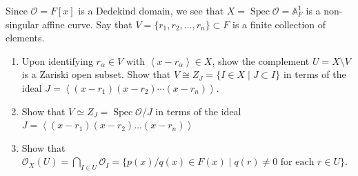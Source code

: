 \documentclass[12 pt, letterpaper]{hmcpset}
\begin{document}
\begin{problem}[Problem 5.]
	Since $\mathcal{O} = F[x]$ is a Dedekind domain, we see that $X = \operatorname{Spec} \mathcal{O} = \mathbb{A}^{1}_{F}$ is a non-singular affine curve. Say that $V = \{ r_{1}, r_{2}, \dots, r_{n} \} \subset F$ is a finite collection of elements.
	\begin{enumerate}
		\item Upon identifying $r_{\alpha} \in V$ with $\left < x - r_{\alpha} \right > \in X$, show the complement $U = X \setminus V$ is a Zariski open subset. Show that $V \cong Z_{J} = \{ I \in X \mid J \subset I \}$ in terms of the ideal $J = \left < (x - r_{1}) (x - r_{2}) \dotsm (x - r_{n}) \right >$.
		\item Show that $V \simeq Z_{J} = \operatorname{Spec} \mathcal{O} / J$ in terms of the ideal $J = \left < (x - r_{1}) (x - r_{2}) \dots (x - r_{n}) \right >$
		\item Show that $\mathcal{O}_{X}(U) = \bigcap_{I \in U} \mathcal{O}_{I} = \{ p(x) / q(x) \in F(x) \mid q(r) \neq 0 \text{ for each } r \in U \}$.
	\end{enumerate}
\end{problem}
\end{document}

